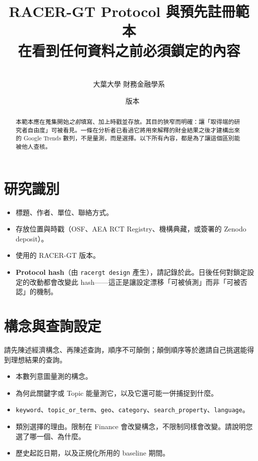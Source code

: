 \documentclass[12pt,a4paper,oneside]{article}
\title{\bfseries RACER-GT Protocol 與預先註冊範本\\[0.4em]
\large 在看到任何資料之前必須鎖定的內容}
\author{\racerauthor\\\small 大葉大學 財務金融學系}
\date{\racerdate\ \textbullet\ 版本 \racerversion}
\begin{document}
\maketitle

\begin{abstract}
\noindent 本範本應在蒐集開始\emph{之前}填寫、加上時戳並存放。其目的狹窄而明確：讓「取得端的研究者自由度」可被看見。一條在分析者已看過它將用來解釋的財金結果之後才建構出來的 Google Trends 數列，不是量測，而是選擇。以下所有內容，都是為了讓這個區別能被他人查核。
\end{abstract}

\tableofcontents
\newpage

\section{研究識別}

\begin{itemize}
\item 標題、作者、單位、聯絡方式。
\item 存放位置與時戳（OSF、AEA RCT Registry、機構典藏，或簽署的 Zenodo deposit）。
\item 使用的 RACER-GT 版本。
\item \textbf{Protocol hash}（由 \texttt{racergt design} 產生），請記錄於此。日後任何對鎖定設定的改動都會改變此 hash——這正是讓設定漂移「可被偵測」而非「可被否認」的機制。
\end{itemize}

\section{構念與查詢設定}

請先陳述經濟構念、再陳述查詢，順序不可顛倒；顛倒順序等於邀請自己挑選能得到理想結果的查詢。

\begin{itemize}
\item 本數列意圖量測的構念。
\item 為何此關鍵字或 Topic 能量測它，以及它還可能一併捕捉到什麼。
\item \texttt{keyword}、\texttt{topic\_or\_term}、\texttt{geo}、\texttt{category}、\texttt{search\_property}、\texttt{language}。
\item 類別選擇的理由。限制在 Finance 會改變構念，不限制同樣會改變。請說明您選了哪一個、為什麼。
\item 歷史起訖日期，以及正規化所用的 baseline 期間。
\end{itemize}
\end{document}

